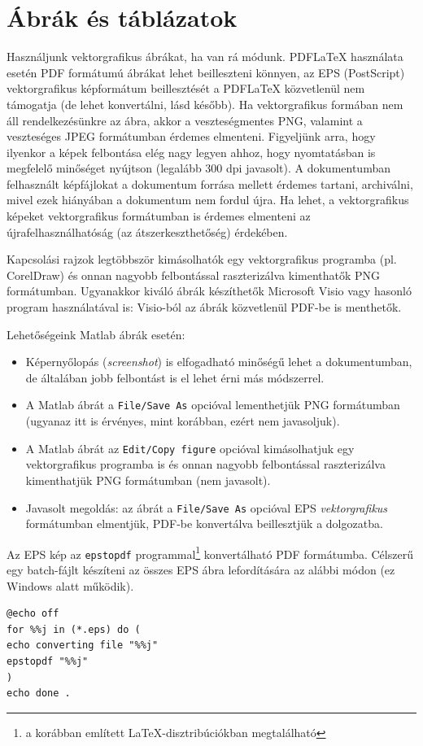 \section{Ábrák és táblázatok}
Használjunk vektorgrafikus ábrákat, ha van rá módunk. PDFLaTeX használata esetén PDF formátumú ábrákat lehet beilleszteni könnyen, az EPS (PostScript) vektorgrafikus képformátum beillesztését a PDFLaTeX közvetlenül nem támogatja (de lehet konvertálni, lásd később). Ha vektorgrafikus formában nem áll rendelkezésünkre az ábra, akkor a  veszteségmentes PNG, valamint a veszteséges JPEG formátumban érdemes elmenteni.  Figyeljünk arra, hogy ilyenkor a képek felbontása elég nagy legyen ahhoz, hogy nyomtatásban is megfelelő minőséget nyújtson (legalább 300 dpi javasolt). A dokumentumban felhasznált képfájlokat a dokumentum forrása mellett érdemes tartani, archiválni, mivel ezek hiányában a dokumentum nem fordul újra. Ha lehet, a vektorgrafikus képeket vektorgrafikus formátumban is érdemes elmenteni az újrafelhasználhatóság (az átszerkeszthetőség) érdekében.

Kapcsolási rajzok legtöbbször kimásolhatók egy vektorgrafikus programba (pl. CorelDraw) és onnan nagyobb felbontással raszterizálva kimenthatők PNG formátumban. Ugyanakkor kiváló ábrák készíthetők Microsoft Visio vagy hasonló program használatával is: Visio-ból az ábrák közvetlenül PDF-be is menthetők.

Lehetőségeink Matlab ábrák esetén:
\begin{itemize}
	\item Képernyőlopás (\emph{screenshot}) is elfogadható minőségű lehet a dokumentumban, de általában jobb felbontást is el lehet érni más módszerrel.
	\item A Matlab ábrát a \verb+File/Save As+ opcióval lementhetjük PNG formátumban (ugyanaz itt is érvényes, mint korábban, ezért nem javasoljuk).
	\item A Matlab ábrát az \verb+Edit/Copy figure+ opcióval kimásolhatjuk egy vektorgrafikus programba is és onnan nagyobb felbontással raszterizálva kimenthatjük PNG formátumban (nem javasolt).
	\item Javasolt megoldás: az ábrát a \verb+File/Save As+ opcióval EPS \emph{vektorgrafikus} formátumban elmentjük, PDF-be konvertálva beillesztjük a dolgozatba.
\end{itemize}
Az EPS kép az \verb+epstopdf+ programmal\footnote{a korábban említett \LaTeX-disztribúciókban megtalálható} konvertálható PDF formátumba. Célszerű egy batch-fájlt készíteni az összes EPS ábra lefordítására az alábbi módon (ez Windows alatt működik).
\begin{lstlisting}
@echo off
for %%j in (*.eps) do (
echo converting file "%%j"
epstopdf "%%j"
)
echo done .
\end{lstlisting}

